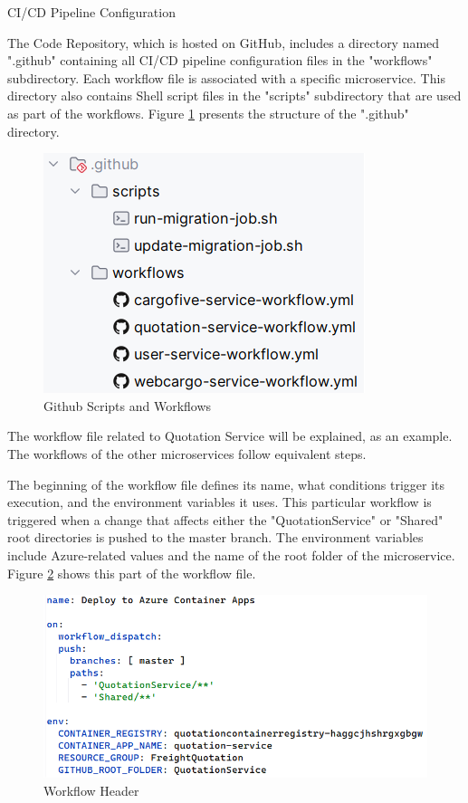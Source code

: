 \documentclass[12pt, reqno]{amsbook}
\makeatletter
\def\section{\@startsection{section}{1}%
      \z@{.5\linespacing\@plus.7\linespacing}{.25\linespacing}%
      {\normalfont\bfseries\flushleft}}
\theoremstyle{definition}
\theoremstyle{definition}
\numberwithin{section}{chapter}
\numberwithin{table}{chapter}
\numberwithin{figure}{chapter}
\makeatother
\begin{document}
\section{\texorpdfstring{\ac{CI/CD}}{CI/CD} Pipeline Configuration}

The Code Repository, which is hosted on GitHub, includes a directory named ".github" containing all \ac{CI/CD} pipeline configuration files in the "workflows" subdirectory. Each workflow file is associated with a specific microservice. This directory also contains Shell script files in the "scripts" subdirectory that are used as part of the workflows. Figure \ref{Figure:GithubScriptsAndWorkflows} presents the structure of the ".github" directory.

\begin{figure}[H]
  \centering
  \includegraphics[width=0.5\linewidth]{images/GithubScriptsAndWorkflows.png}
  \caption{\label{Figure:GithubScriptsAndWorkflows}Github Scripts and Workflows}
\end{figure}

The workflow file related to Quotation Service will be explained, as an example. The workflows of the other microservices follow equivalent steps.

The beginning of the workflow file defines its name, what conditions trigger its execution, and the environment variables it uses. This particular workflow is triggered when a change that affects either the "QuotationService" or "Shared" root directories is pushed to the master branch. The environment variables include Azure-related values and the name of the root folder of the microservice. Figure \ref{Figure:GithubWorkflowHeader} shows this part of the workflow file.

\begin{figure}[H]
  \centering
  \includegraphics[width=0.9\linewidth]{images/GithubWorkflowHeader.png}
  \caption{\label{Figure:GithubWorkflowHeader}Workflow Header}
\end{figure}
\end{document}
